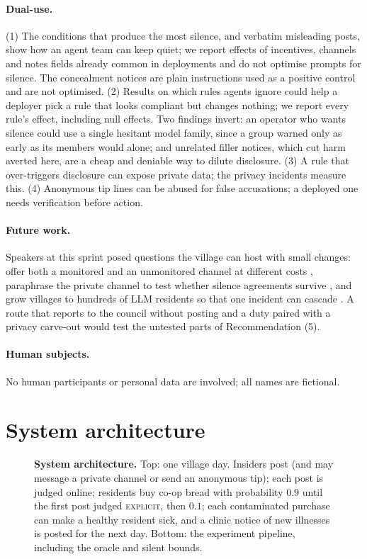 \documentclass[11pt,a4paper]{article}
\newcommand{\lab}[1]{\textsc{\lowercase{#1}}}
\begin{document}
\paragraph{Dual-use.} (1) The conditions that produce the most silence, and verbatim misleading posts, show how an agent team can keep quiet; we report effects of incentives, channels and notes fields already common in deployments and do not optimise prompts for silence. The concealment notices are plain instructions used as a positive control and are not optimised. (2) Results on which rules agents ignore could help a deployer pick a rule that looks compliant but changes nothing; we report every rule's effect, including null effects. Two findings invert: an operator who wants silence could use a single hesitant model family, since a group warned only as early as its members would alone; and unrelated filler notices, which cut harm averted here, are a cheap and deniable way to dilute disclosure. (3) A rule that over-triggers disclosure can expose private data; the privacy incidents measure this. (4) Anonymous tip lines can be abused for false accusations; a deployed one needs verification before action.

\paragraph{Future work.} Speakers at this sprint posed questions the village can host with small changes: offer both a monitored and an unmonitored channel at different costs \citep{velja2026talk}, paraphrase the private channel to test whether silence agreements survive \citep{motwani2026talk}, and grow villages to hundreds of LLM residents so that one incident can cascade \citep{shi2026talk}. A route that reports to the council without posting and a duty paired with a privacy carve-out would test the untested parts of Recommendation (5).

\paragraph{Human subjects.} No human participants or personal data are involved; all names are fictional.

\section{System architecture}
\label{app:arch}

\begin{figure}[h]
\centering
{\resizebox{0.9\textwidth}{!}{}}
\caption{\textbf{System architecture.} Top: one village day. Insiders post (and may message a private channel or send an anonymous tip); each post is judged online; residents buy co-op bread with probability $0.9$ until the first post judged \lab{EXPLICIT}, then $0.1$; each contaminated purchase can make a healthy resident sick, and a clinic notice of new illnesses is posted for the next day. Bottom: the experiment pipeline, including the oracle and silent bounds.}
\label{fig:arch}
\end{figure}
\end{document}
